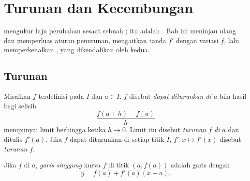 \chapter{Turunan dan Kecembungan}\label{ch:g12:deriv}

 mengukur laju perubahan sesaat sebuah ;  itu adalah
  . Bab ini meninjau ulang dan memperluas
aturan penurunan, mengaitkan tanda $f'$ dengan variasi $f$,
lalu memperkenalkan , yang dikendalikan oleh  kedua.

\section{Turunan}

\begin{definition}\label{def:g12:deriv:derivative}
Misalkan $f$ terdefinisi pada  $I$ dan $a \in I$.  $f$ disebut
\emph{dapat diturunkan di $a$} bila hasil bagi selisih
\[
\frac{f(a+h) - f(a)}{h}
\]
mempunyai limit berhingga ketika $h \to 0$. Limit itu disebut \emph{turunan
$f$ di $a$} dan ditulis $f'(a)$. Jika $f$ dapat diturunkan di setiap titik
$I$,  $f' \colon x \mapsto f'(x)$ disebut \emph{turunan}
$f$.
\end{definition}

\begin{definition}\label{def:g12:deriv:tangent}
Jika $f$  di $a$, \emph{garis singgung}
kurva $f$ di titik $(a, f(a))$ adalah garis dengan 
\[
y = f(a) + f'(a)(x - a).
\]
\end{definition}

